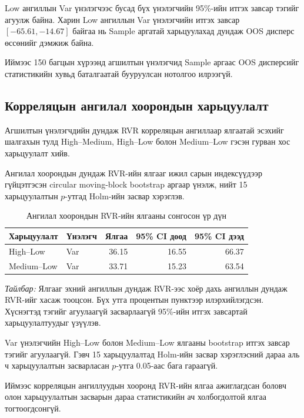 Low ангиллын Var үнэлэгчээс бусад
бүх үнэлэгчийн 95\%-ийн итгэх завсар
тэгийг агуулж байна. Харин Low
ангиллын Var үнэлэгчийн итгэх завсар
$[-65.61,-14.67]$ байгаа нь Sample
аргатай харьцуулахад дундаж OOS
дисперс өссөнийг дэмжиж байна.

Иймээс 150 багцын хүрээнд агшилтын
үнэлэгчид Sample аргаас OOS дисперсийг
статистикийн хувьд баталгаатай
бууруулсан нотолгоо илрээгүй.

\subsection{Корреляцын ангилал хоорондын харьцуулалт}
\label{subsec:tier_comparison_results}

Агшилтын үнэлэгчдийн дундаж RVR
корреляцын ангиллаар ялгаатай эсэхийг
шалгахын тулд High--Medium, High--Low
болон Medium--Low гэсэн гурван хос
харьцуулалт хийв.

Ангилал хоорондын дундаж RVR-ийн
ялгааг ижил сарын индексүүдээр
гүйцэтгэсэн circular moving-block
bootstrap аргаар үнэлж, нийт 15
харьцуулалтын $p$-утгад Holm-ийн
засвар хэрэглэв.

\begin{table}[htbp]
	\centering
	\caption{Ангилал хоорондын RVR-ийн ялгааны сонгосон үр дүн}
	\label{tab:tier_comparison}
	\small
	\begin{tabular}{llrrr}
		\hline
		Харьцуулалт & Үнэлэгч &
		Ялгаа & 95\% CI доод & 95\% CI дээд\\
		\hline
		High--Low   & Var & 36.15 & 16.55 & 66.37\\
		Medium--Low & Var & 33.71 & 15.23 & 63.54\\
		\hline
	\end{tabular}
\end{table}

\noindent
\textit{Тайлбар:} Ялгааг эхний ангиллын
дундаж RVR-ээс хоёр дахь ангиллын
дундаж RVR-ийг хасаж тооцсон.
Бүх утга процентын пунктээр илэрхийлэгдсэн.
Хүснэгтэд тэгийг агуулаагүй
засварлаагүй 95\%-ийн итгэх
завсартай харьцуулалтуудыг үзүүлэв.

Var үнэлэгчийн High--Low болон
Medium--Low ялгааны bootstrap
итгэх завсар тэгийг агуулаагүй.
Гэвч 15 харьцуулалтад Holm-ийн
засвар хэрэглэсний дараа аль ч
харьцуулалтын засварласан
$p$-утга 0.05-аас бага гараагүй.

Иймээс корреляцын ангиллуудын
хооронд RVR-ийн ялгаа ажиглагдсан
боловч олон харьцуулалтын засварын
дараа статистикийн ач холбогдолтой
ялгаа тогтоогдсонгүй.


